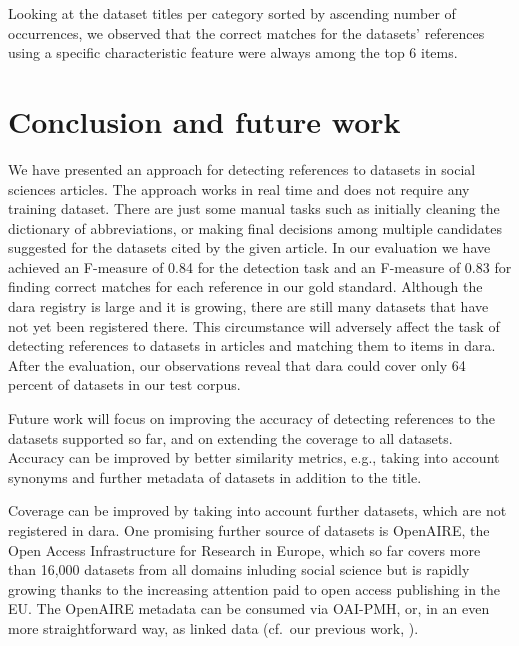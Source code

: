 \documentclass{IOS-Book-Article}
\newcommand{\dara}{\textsf{da\textbar ra}}
\begin{document}
Looking at the dataset titles per category sorted by ascending number of occurrences, we observed that the correct matches for the datasets' references using a specific characteristic feature were always among the top 6 items. %
 
\section{Conclusion and future work}
\label{sec:future}
We have presented an approach for detecting references to datasets in social sciences articles.
The approach works in real time and does not require any training dataset.
There are just some manual tasks such as initially cleaning the dictionary of abbreviations, or making final decisions among multiple candidates suggested for the datasets cited by the given article.
In our evaluation we have achieved an F-measure of 0.84 for the detection task and an F-measure of 0.83 for finding correct matches for each reference in our gold standard.  
Although the {\dara} registry is large and it is growing, there are still many datasets that have not yet been registered there. 
This circumstance will adversely affect the task of detecting references to datasets in articles and matching them to items in {\dara}.
After the evaluation, our observations reveal that {\dara} could cover only 64 percent of datasets in our test corpus. 

Future work will focus on improving the accuracy of detecting references to the datasets supported so far, and on extending the coverage to all datasets.
Accuracy can be improved by better similarity metrics, e.g., taking into account synonyms and further metadata of datasets in addition to the title.

Coverage can be improved by taking into account further datasets, which are not registered in {\dara}.
One promising further source of datasets is OpenAIRE, the Open Access Infrastructure for Research in Europe, which so far covers more than 16,000 datasets from all domains inluding social science but is rapidly growing thanks to the increasing attention paid to open access publishing in the EU.
The OpenAIRE metadata can be consumed via OAI-PMH, or, in an even more straightforward way, as linked data (cf.\ our previous work, \citet{VahdatiEtAl:MappingResearchMetadata15}).
\end{document}
